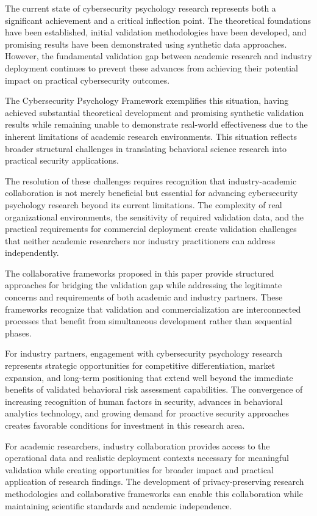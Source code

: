 \documentclass[10pt,twocolumn]{IEEEtran}
\begin{document}
The current state of cybersecurity psychology research represents both a significant achievement and a critical inflection point. The theoretical foundations have been established, initial validation methodologies have been developed, and promising results have been demonstrated using synthetic data approaches. However, the fundamental validation gap between academic research and industry deployment continues to prevent these advances from achieving their potential impact on practical cybersecurity outcomes.

The Cybersecurity Psychology Framework exemplifies this situation, having achieved substantial theoretical development and promising synthetic validation results while remaining unable to demonstrate real-world effectiveness due to the inherent limitations of academic research environments. This situation reflects broader structural challenges in translating behavioral science research into practical security applications.

The resolution of these challenges requires recognition that industry-academic collaboration is not merely beneficial but essential for advancing cybersecurity psychology research beyond its current limitations. The complexity of real organizational environments, the sensitivity of required validation data, and the practical requirements for commercial deployment create validation challenges that neither academic researchers nor industry practitioners can address independently.

The collaborative frameworks proposed in this paper provide structured approaches for bridging the validation gap while addressing the legitimate concerns and requirements of both academic and industry partners. These frameworks recognize that validation and commercialization are interconnected processes that benefit from simultaneous development rather than sequential phases.

For industry partners, engagement with cybersecurity psychology research represents strategic opportunities for competitive differentiation, market expansion, and long-term positioning that extend well beyond the immediate benefits of validated behavioral risk assessment capabilities. The convergence of increasing recognition of human factors in security, advances in behavioral analytics technology, and growing demand for proactive security approaches creates favorable conditions for investment in this research area.

For academic researchers, industry collaboration provides access to the operational data and realistic deployment contexts necessary for meaningful validation while creating opportunities for broader impact and practical application of research findings. The development of privacy-preserving research methodologies and collaborative frameworks can enable this collaboration while maintaining scientific standards and academic independence.
\end{document}
